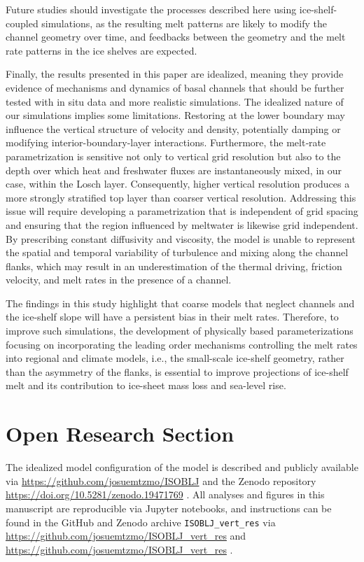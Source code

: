 \documentclass[draft]{agujournal2019}
\begin{document}
Future studies should investigate the processes described here using ice-shelf-coupled simulations, as the resulting melt patterns are likely to modify the channel geometry over time, and feedbacks between the geometry and the melt rate patterns in the ice shelves are expected.

Finally, the results presented in this paper are idealized, meaning they provide evidence of mechanisms and dynamics of basal channels that should be further tested with in situ data and more realistic simulations. The idealized nature of our simulations implies some limitations.
Restoring at the lower boundary may influence the vertical structure of velocity and density, potentially damping or modifying interior-boundary-layer interactions. Furthermore, the melt‑rate parametrization is sensitive not only to vertical grid resolution but also to the depth over which heat and freshwater fluxes are instantaneously mixed, in our case, within the Losch layer. Consequently, higher vertical resolution produces a more strongly stratified top layer than coarser vertical resolution. Addressing this issue will require developing a parametrization that is independent of grid spacing and ensuring that the region influenced by meltwater is likewise grid independent. By prescribing constant diffusivity and viscosity, the model is unable to represent the spatial and temporal variability of turbulence and mixing along the channel flanks, which may result in an underestimation of the thermal driving, friction velocity, and melt rates in the presence of a channel.

The findings in this study highlight that coarse models that neglect channels and the ice-shelf slope will have a persistent bias in their melt rates. Therefore, to improve such simulations, the development of physically based parameterizations focusing on incorporating the leading order mechanisms controlling the melt rates into regional and climate models, i.e., the small-scale ice-shelf geometry, rather than the asymmetry of the flanks, is essential to improve projections of ice-shelf melt and its contribution to ice-sheet mass loss and sea-level rise.

%
%

\section*{Open Research Section}
The idealized model configuration of the model is described and publicly available via \url{https://github.com/josuemtzmo/ISOBLJ} and the Zenodo repository \url{https://doi.org/10.5281/zenodo.19471769} \citep{Martinez_ISOBLJ_2026}.
All analyses and figures in this manuscript are reproducible via Jupyter notebooks, and instructions can be found in the GitHub and Zenodo archive \texttt{ISOBLJ\_vert\_res} via \url{https://github.com/josuemtzmo/ISOBLJ\_vert\_res} and \url{https://github.com/josuemtzmo/ISOBLJ\_vert\_res} \citep{Martinez_ISOBLJ_manuscript_2026}.
\end{document}

